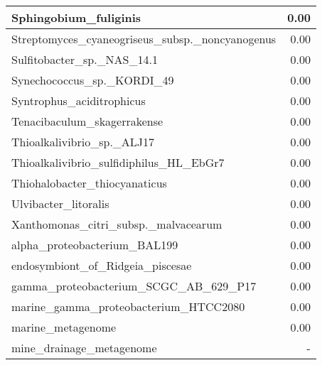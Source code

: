 \documentclass[12pt,a4paper]{article}
\begin{document}
\begin{table}[ht]
\begin{center}
\begin{tabular}{|l*{1}{|r}|}
Sphingobium\_fuliginis & 0.00 \\ \hline
Streptomyces\_cyaneogriseus\_subsp.\_noncyanogenus & 0.00 \\ \hline
Sulfitobacter\_sp.\_NAS\_14.1 & 0.00 \\ \hline
Synechococcus\_sp.\_KORDI\_49 & 0.00 \\ \hline
Syntrophus\_aciditrophicus & 0.00 \\ \hline
Tenacibaculum\_skagerrakense & 0.00 \\ \hline
Thioalkalivibrio\_sp.\_ALJ17 & 0.00 \\ \hline
Thioalkalivibrio\_sulfidiphilus\_HL\_EbGr7 & 0.00 \\ \hline
Thiohalobacter\_thiocyanaticus & 0.00 \\ \hline
Ulvibacter\_litoralis & 0.00 \\ \hline
Xanthomonas\_citri\_subsp.\_malvacearum & 0.00 \\ \hline
alpha\_proteobacterium\_BAL199 & 0.00 \\ \hline
endosymbiont\_of\_Ridgeia\_piscesae & 0.00 \\ \hline
gamma\_proteobacterium\_SCGC\_AB\_629\_P17 & 0.00 \\ \hline
marine\_gamma\_proteobacterium\_HTCC2080 & 0.00 \\ \hline
marine\_metagenome & 0.00 \\ \hline
mine\_drainage\_metagenome & - \\ \hline
\end{tabular}
\end{center}
\end{table}
\end{document}
